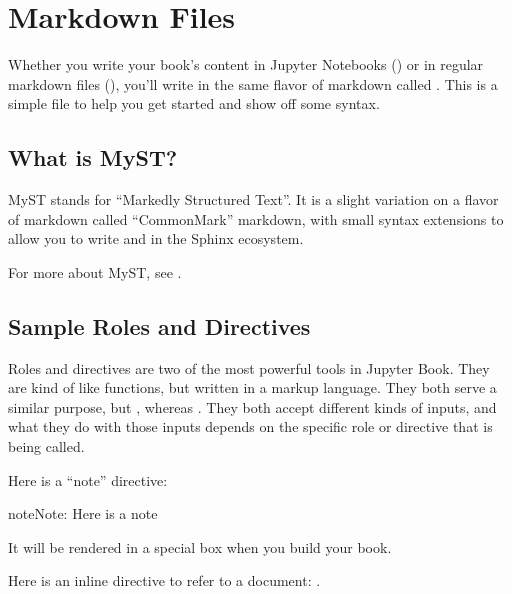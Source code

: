 \documentclass[letterpaper,10pt,english]{jupyterBook}
\begin{document}
\section{Markdown Files}
\label{\detokenize{src/test/markdown:markdown-files}}\label{\detokenize{src/test/markdown::doc}}
\sphinxAtStartPar
Whether you write your book’s content in Jupyter Notebooks () or
in regular markdown files (), you’ll write in the same flavor of markdown
called .
This is a simple file to help you get started and show off some syntax.


\subsection{What is MyST?}
\label{\detokenize{src/test/markdown:what-is-myst}}
\sphinxAtStartPar
MyST stands for “Markedly Structured Text”. It
is a slight variation on a flavor of markdown called “CommonMark” markdown,
with small syntax extensions to allow you to write  and 
in the Sphinx ecosystem.

\sphinxAtStartPar
For more about MyST, see .


\subsection{Sample Roles and Directives}
\label{\detokenize{src/test/markdown:sample-roles-and-directives}}
\sphinxAtStartPar
Roles and directives are two of the most powerful tools in Jupyter Book. They
are kind of like functions, but written in a markup language. They both
serve a similar purpose, but , whereas
. They both accept different kinds of inputs,
and what they do with those inputs depends on the specific role or directive
that is being called.

\sphinxAtStartPar
Here is a “note” directive:

\begin{sphinxadmonition}{note}{Note:}
\sphinxAtStartPar
Here is a note
\end{sphinxadmonition}

\sphinxAtStartPar
It will be rendered in a special box when you build your book.

\sphinxAtStartPar
Here is an inline directive to refer to a document: {\hyperref[\detokenize{src/test/markdown-notebooks::doc}]{}}.
\end{document}
